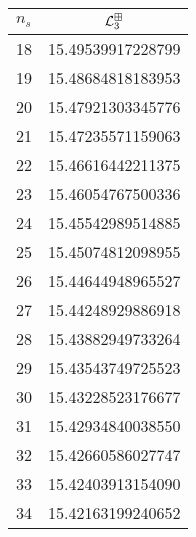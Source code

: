 \begin{tabular}[t]{lc}
\toprule
  $n_{s}$ &  $\mathcal L^{\boxplus}_3$ \\ \toprule
\midrule
       18 &                   15.49539917228799 \\
       19 &                   15.48684818183953 \\
       20 &                   15.47921303345776 \\
       21 &                   15.47235571159063 \\
       22 &                   15.46616442211375 \\
       23 &                   15.46054767500336 \\
       24 &                   15.45542989514885 \\
       25 &                   15.45074812098955 \\
       26 &                   15.44644948965527 \\
       27 &                   15.44248929886918 \\
       28 &                   15.43882949733264 \\
       29 &                   15.43543749725523 \\
       30 &                   15.43228523176677 \\
       31 &                   15.42934840038550 \\
       32 &                   15.42660586027747 \\
       33 &                   15.42403913154090 \\
       34 &                   15.42163199240652 \\
\bottomrule
\end{tabular}
\hspace{2em}
